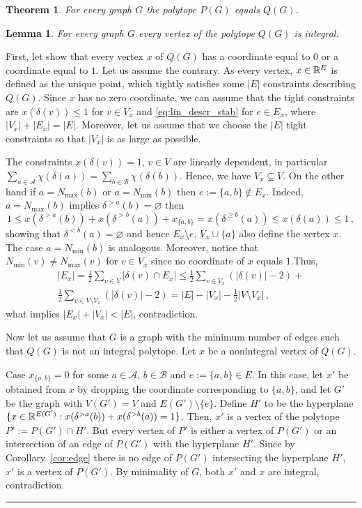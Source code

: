 \documentclass[preprint]{elsarticle}
\newtheorem{lemma}[fact]{Lemma}
\newtheorem{theorem}[fact]{Theorem}
\newenvironment{proof}{{\bf Proof:  }}{\hfill\rule{2mm}{2mm}}
\begin{document}
\begin{theorem}
	For every graph $G$ the polytope $P(G)$ equals $Q(G)$.
\end{theorem}


\begin{lemma}
	For every graph $G$ every vertex of the polytope $Q(G)$ is integral.
\end{lemma}
\begin{proof}
First, let show that every vertex $x$ of $Q(G)$ has a coordinate equal to $0$ or a coordinate equal to $1$. Let us assume the contrary. As every vertex, $x\in \mathbb{R}^E$ is defined as the unique point, which tightly satisfies some $|E|$ constraints describing $Q(G)$. Since $x$ has no zero coordinate, we can assume  that the tight constraints are $x(\delta(v))\le 1$ for $v\in V_x$ and \eqref{eq:lin_descr_stab} for $e\in E_x$, where $|V_x|+|E_x|=|E|$. Moreover, let us assume that we choose the $|E|$ tight constraints so that $|V_x|$ is as large as possible. 

The constraints $x(\delta(v))=1$, $v\in V$ are linearly dependent, in particular $\sum_{a\in\mathcal{A}}\chi(\delta(a))=\sum_{b\in\mathcal{B}}\chi(\delta(b))$. Hence, we have $V_x\subsetneq V$. On the other hand if $a=N_{\max}(b)$ or $a=N_{\min}(b)$ then $e:=\{a,b\}\not\in E_x$. Indeed, $a=N_{\max}(b)$ implies $\delta^{>a}(b)=\varnothing$ then
$$
	1\le x(\delta^{>a}(b))+ x(\delta^{>b}(a)) + x_{\{a,b\}}=x(\delta^{\ge b}(a)) \le x(\delta(a)) \le 1\,,
$$
showing that $\delta^{< b}(a)=\varnothing$ and hence $E_x\setminus e$, $V_x\cup \{a\}$ also define the vertex $x$. The case $a=N_{\min}(b)$ is analogous. Moreover, notice that $N_{\min}(v)\neq N_{\max}(v)$ for $v\in V_x$ since no coordinate of $x$ equals $1$.Thus, 
\begin{multline*}
	|E_x|=\frac{1}{2}\sum_{v\in V} |\delta(v)\cap E_x|\le \frac{1}{2}\sum_{v\in V_x} (|\delta(v)|-2)+\\\frac{1}{2}\sum_{v\in V\setminus V_x} (|\delta(v)|-2)= |E|-|V_x|-\frac{1}{2}|V\setminus V_x|\,,
\end{multline*}
what implies $|E_x|+|V_x|< |E|$, contradiction.

\bigskip

Now let us assume that $G$ is a graph with the minimum number of edges such that $Q(G)$ is not an integral polytope. Let $x$ be a nonintegral vertex of $Q(G)$.

Case $x_{\{a,b\}}=0$ for some $a\in \mathcal{A}$, $b\in\mathcal{B}$ and $e:=\{a,b\}\in E$. In this case, let $x'$ be obtained from $x$ by dropping the coordinate corresponding to $\{a,b\}$, and let $G'$ be the graph with $V(G')=V$ and $E(G')\setminus \{e\}$. Define $H'$ to be the hyperplane $\{x\in \mathbb{R}^{E(G')}: x(\delta^{>a}(b))+ x(\delta^{>b}(a))=1\}$. Then, $x'$ is a vertex of the polytope $P':=P(G')\cap H'$.
But every vertex of $P'$ is either a vertex of $P(G')$ or an intersection of an edge of $P(G')$ with the hyperplane $H'$. Since by Corollary~\ref{cor:edge} there is no edge of $P(G')$ intersecting the hyperplane $H'$, $x'$ is a vertex of $P(G')$. By minimality of $G$, both $x'$ and $x$ are integral, contradiction.


\end{proof}
\end{document}
